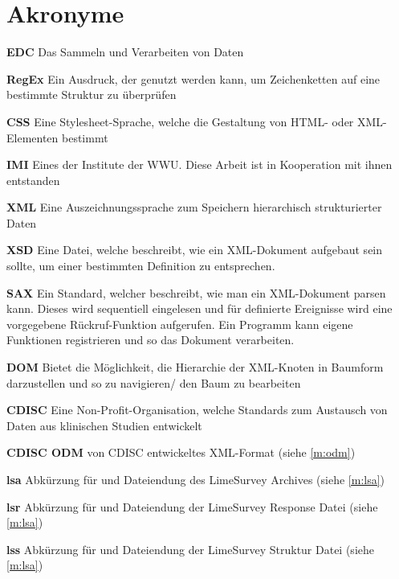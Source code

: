 \chapter{Akronyme}

\begin{description}[font=\sffamily\bfseries, leftmargin=0cm, itemsep=-0.15cm, style=nextline]
	\item \textbf{EDC}  Das Sammeln und Verarbeiten von Daten
	\item \textbf{RegEx}  Ein Ausdruck, der genutzt werden kann, um Zeichenketten auf eine bestimmte Struktur zu überprüfen
	\item \textbf{CSS}  Eine Stylesheet-Sprache, welche die Gestaltung von HTML- oder XML-Elementen bestimmt
	\item \textbf{IMI}  Eines der Institute der WWU. Diese Arbeit ist in Kooperation mit ihnen entstanden
	\item \textbf{XML}  Eine Auszeichnungssprache zum Speichern hierarchisch strukturierter Daten 
	\item \textbf{XSD}  Eine Datei, welche beschreibt, wie ein XML-Dokument aufgebaut sein sollte, um einer bestimmten Definition zu entsprechen.
	\item \textbf{SAX}  Ein Standard, welcher beschreibt, wie man ein XML-Dokument parsen kann. Dieses wird sequentiell eingelesen und für definierte Ereignisse wird eine vorgegebene Rückruf-Funktion aufgerufen. Ein Programm kann eigene Funktionen registrieren und so das Dokument verarbeiten.
	\item \textbf{DOM}  Bietet die Möglichkeit, die Hierarchie der XML-Knoten in Baumform darzustellen und so zu navigieren/ den Baum zu bearbeiten
	\item \textbf{CDISC}  Eine Non-Profit-Organisation, welche Standards zum Austausch von Daten aus klinischen Studien entwickelt
	\item \textbf{CDISC ODM}  von CDISC entwickeltes XML-Format (siehe \cref{m:odm})
	\item \textbf{lsa} Abkürzung für und Dateiendung des LimeSurvey Archives (siehe \cref{m:lsa})
	\item \textbf{lsr} Abkürzung für und Dateiendung der LimeSurvey Response Datei (siehe \cref{m:lsa})
	\item \textbf{lss} Abkürzung für und Dateiendung der LimeSurvey Struktur Datei (siehe \cref{m:lsa})
\end{description}

